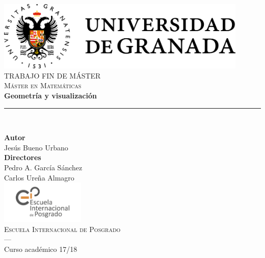 \begin{titlepage}
 
 
\newlength{\centeroffset}
\setlength{\centeroffset}{-0.5\oddsidemargin}
\addtolength{\centeroffset}{0.5\evensidemargin}
\thispagestyle{empty}

\noindent\hspace*{\centeroffset}\begin{minipage}{\textwidth}

\centering
\includegraphics[width=0.9\textwidth]{images/logo_ugr.png}\\[1.4cm]

\textsc{ \Large TRABAJO FIN DE MÁSTER\\[0.2cm]}
\textsc{Máster en Matemáticas}\\[1cm]
% 
{\Huge\bfseries Geometría y visualización\\
}
\noindent\rule[-1ex]{\textwidth}{3pt}\\[3.5ex]
\end{minipage}

\vspace{2.5cm}
\noindent\hspace*{\centeroffset}\begin{minipage}{\textwidth}
\centering

\textbf{Autor}\\ {Jesús Bueno Urbano}\\[2.5ex]
\textbf{Directores}\\
{Pedro A. García Sánchez\\
Carlos Ureña Almagro}\\[2cm]
\includegraphics[width=0.3\textwidth]{images/eip-ugr.jpg}\\[0.1cm]
\textsc{Escuela Internacional de Posgrado}\\
\textsc{---}\\
Curso académico 17/18
\end{minipage}
\end{titlepage}


